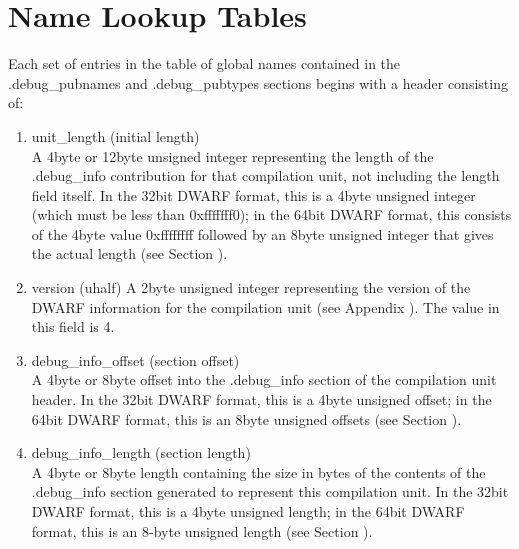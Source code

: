 \section{Name Lookup Tables}
\label{datarep:namelookuptables}

Each set of entries in the table of global names contained
in the .debug\_pubnames and .debug\_pubtypes sections begins
with a header consisting of:


\begin{enumerate}[1.]
\item unit\_length (initial length) \\
A 4\dash byte or 12\dash byte unsigned integer representing the length
of the .debug\_info contribution for that compilation unit,
not including the length field itself. In the 32\dash bit DWARF
format, this is a 4\dash byte unsigned integer (which must be less
than 0xfffffff0); in the 64\dash bit DWARF format, this consists
of the 4\dash byte value 0xffffffff followed by an 8\dash byte unsigned
integer that gives the actual length
(see Section ).

\item  version (uhalf)
A 2\dash byte unsigned integer representing the version of the
DWARF information for the compilation unit
(see Appendix ).
The value in this field is 4.

\item debug\_info\_offset (section offset) \\
A 4\dash byte or 8\dash byte offset into the .debug\_info
section of the compilation unit header.
In
the 32\dash bit DWARF format, this is a 4\dash byte unsigned offset;
in the 64\dash bit DWARF format, this is an 8\dash byte unsigned offsets
(see Section ).

\item  debug\_info\_length (section length) \\
A 4\dash byte or 8\dash byte length containing the size in bytes of the
contents of the .debug\_info section generated to represent
this compilation unit. In the 32\dash bit DWARF format, this is
a 4\dash byte unsigned length; in the 64\dash bit DWARF format, this
is an 8-byte unsigned length 
(see Section ).


\end{enumerate}

